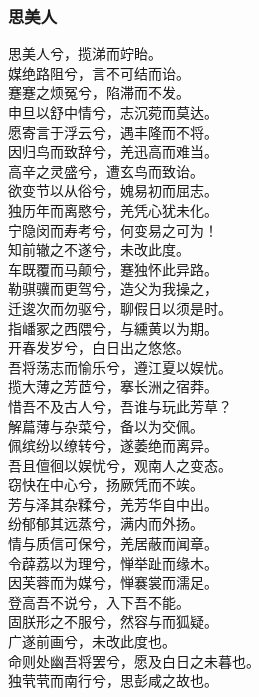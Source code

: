 \documentclass[]{article}
\begin{document}
\hypertarget{header-n105}{%
\subsubsection{思美人}\label{header-n105}}

思美人兮，揽涕而竚眙。\\
媒绝路阻兮，言不可结而诒。\\
蹇蹇之烦冤兮，陷滞而不发。\\
申旦以舒中情兮，志沉菀而莫达。\\
愿寄言于浮云兮，遇丰隆而不将。\\
因归鸟而致辞兮，羌迅高而难当。\\
高辛之灵盛兮，遭玄鸟而致诒。\\
欲变节以从俗兮，媿易初而屈志。\\
独历年而离愍兮，羌凭心犹未化。\\
宁隐闵而寿考兮，何变易之可为！\\
知前辙之不遂兮，未改此度。\\
车既覆而马颠兮，蹇独怀此异路。\\
勒骐骥而更驾兮，造父为我操之，\\
迁逡次而勿驱兮，聊假日以须是时。\\
指嶓冢之西隈兮，与纁黄以为期。\\
开春发岁兮，白日出之悠悠。\\
吾将荡志而愉乐兮，遵江夏以娱忧。\\
揽大薄之芳茝兮，搴长洲之宿莽。\\
惜吾不及古人兮，吾谁与玩此芳草？\\
解萹薄与杂菜兮，备以为交佩。\\
佩缤纷以缭转兮，遂萎绝而离异。\\
吾且儃徊以娱忧兮，观南人之变态。\\
窃快在中心兮，扬厥凭而不竢。\\
芳与泽其杂糅兮，羌芳华自中出。\\
纷郁郁其远蒸兮，满内而外扬。\\
情与质信可保兮，羌居蔽而闻章。\\
令薜荔以为理兮，惮举趾而缘木。\\
因芙蓉而为媒兮，惮褰裳而濡足。\\
登高吾不说兮，入下吾不能。\\
固朕形之不服兮，然容与而狐疑。\\
广遂前画兮，未改此度也。\\
命则处幽吾将罢兮，愿及白日之未暮也。\\
独茕茕而南行兮，思彭咸之故也。
\end{document}
